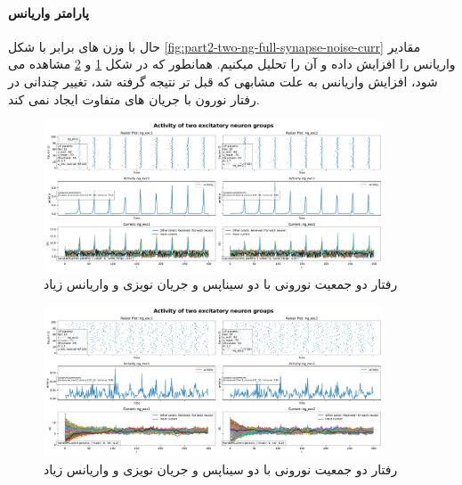 \documentclass{report}
\begin{document}
        \paragraph*{پارامتر واریانس}
            حال با وزن های برابر با شکل 
            \ref{fig:part2-two-ng-full-synapse-noise-curr}
            مقادیر واریانس را افزایش داده و آن را تحلیل میکنیم.
            همانطور که در شکل 
            \ref{fig:part2-two-ng-full-synapse-high-variance-noise-curr} و \ref{fig:part2-two-ng-full-synapse-high-variance-rand-curr}
            مشاهده می شود، افزایش واریانس به علت مشابهی که قبل تر نتیجه گرفته شد، تغییر چندانی در رفتار نورون با جریان های متفاوت ایجاد نمی کند.
            \begin{figure}[!ht]
                \centering
                \includegraphics[width=0.9\textwidth]{plots/part2-two-ng-full-synapse-diff-variance-noise-curr.pdf} 
                \caption{رفتار دو جمعیت نورونی با دو سیناپس و جریان نویزی و واریانس زیاد}
                \label{fig:part2-two-ng-full-synapse-high-variance-noise-curr}
            \end{figure}
            \begin{figure}[!ht]
                \centering
                \includegraphics[width=0.9\textwidth]{plots/part2-two-ng-full-synapse-diff-variance-rand-curr.pdf} 
                \caption{رفتار دو جمعیت نورونی با دو سیناپس و جریان نویزی و واریانس زیاد}
                \label{fig:part2-two-ng-full-synapse-high-variance-rand-curr}
            \end{figure}
\end{document}
